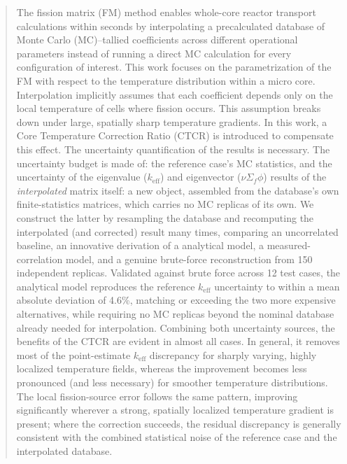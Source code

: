 \documentclass{style/nseJournal}
\begin{document}
\begin{abstract}
The fission matrix (FM) method enables whole-core reactor transport calculations within seconds by interpolating a precalculated database of Monte Carlo (MC)--tallied coefficients across different operational parameters instead of running a direct MC calculation for every configuration of interest. This work focuses on the parametrization of the FM with respect to the temperature distribution within a micro core. Interpolation implicitly assumes that each coefficient depends only on the local temperature of cells where fission occurs. This assumption breaks down under large, spatially sharp temperature gradients. In this work, a Core Temperature Correction Ratio (CTCR) is introduced to compensate this effect.
The uncertainty quantification of the results is necessary. The uncertainty budget is made of: the reference case's MC statistics, and the uncertainty of the eigenvalue ($k_{\text{eff}}$) and eigenvector ($\nu\Sigma_f\phi$) results of the \emph{interpolated} matrix itself: a new object, assembled from the database's own finite-statistics matrices, which carries no MC replicas of its own. We construct the latter by resampling the database and recomputing the interpolated (and corrected) result many times, comparing an uncorrelated baseline, an innovative derivation of a analytical model, a measured-correlation model, and a genuine brute-force reconstruction from 150 independent replicas. Validated against brute force across 12 test cases, the analytical model reproduces the reference $k_{\text{eff}}$ uncertainty to within a mean absolute deviation of 4.6\%, matching or exceeding the two more expensive alternatives, while requiring no MC replicas beyond the nominal database already needed for interpolation. Combining both uncertainty sources, the benefits of the CTCR are evident in almost all cases. In general, it removes most of the point-estimate $k_{\text{eff}}$ discrepancy for sharply varying, highly localized temperature fields, whereas the improvement becomes less pronounced (and less necessary) for smoother temperature distributions. The local fission-source error follows the same pattern, improving significantly wherever a strong, spatially localized temperature gradient is present; where the correction succeeds, the residual discrepancy is generally consistent with the combined statistical noise of the reference case and the interpolated database.
\end{abstract}
\end{document}
